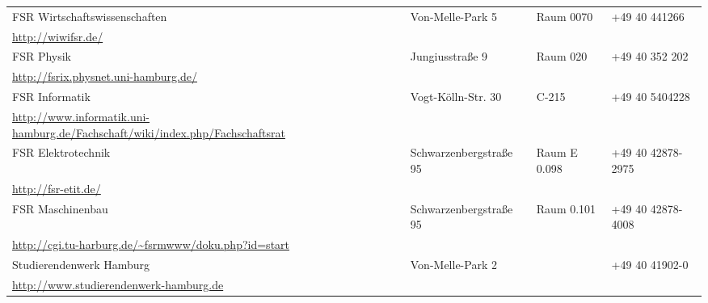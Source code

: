 \begin{tabularx}{\textwidth}{|X|X|X|X|}
\hline FSR Wirtschaftswissenschaften&Von-Melle-Park 5&Raum 0070&+49 40 441266\\
       \url{http://wiwifsr.de/}&&&\\
\hline FSR Physik&Jungiusstraße 9&Raum 020&+49 40 352 202\\
       \url{http://fsrix.physnet.uni-hamburg.de/}&&&\\
\hline FSR Informatik&Vogt-Kölln-Str. 30&C-215&+49 40 5404228\\
\url{http://www.informatik.uni-hamburg.de/Fachschaft/wiki/index.php/Fachschaftsrat}&&&\\
\hline FSR Elektrotechnik&Schwarzenbergstraße 95&Raum E 0.098&+49 40 42878-2975\\
       \url{http://fsr-etit.de/}&&&\\
\hline FSR Maschinenbau&Schwarzenbergstraße 95&Raum 0.101&+49 40 42878-4008\\
       \url{http://cgi.tu-harburg.de/~fsrmwww/doku.php?id=start}&&&\\
\hline Studierendenwerk Hamburg&Von-Melle-Park 2&&+49 40 41902-0\\
       \url{http://www.studierendenwerk-hamburg.de}&&&\\
\hline
\end{tabularx}
\clearpage

